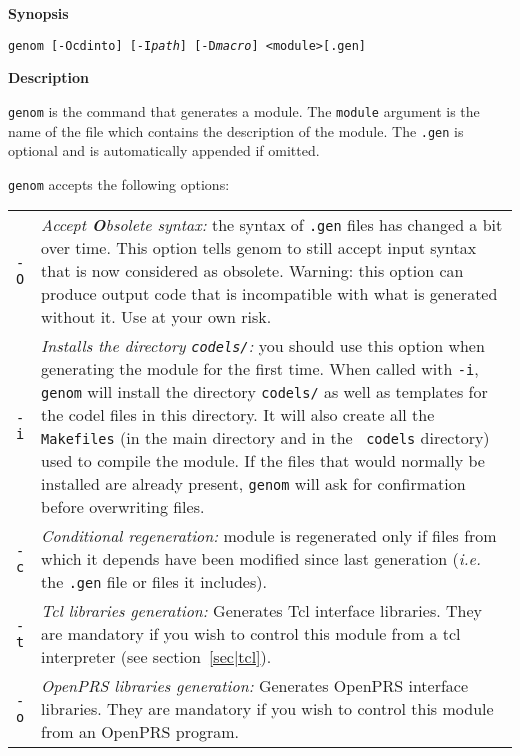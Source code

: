 \begin{description}

\item{\bf Synopsis}

{\tt genom [-Ocdinto] [-I{\em path}] [-D{\em macro}] <module>[.gen]}

\item{\bf Description}

{\tt genom}  is the  command that  generates a  module. The  {\tt module}
argument is the name  of the file which  contains the description of  the
module. The {\tt  .gen} is   optional and  is  automatically appended  if
omitted.

{\tt genom} accepts the following options:

\begin{tabularx}{\linewidth}{lX}
{\tt -O} & {\em Accept \textbf{O}bsolete syntax:} the syntax of
\texttt{.gen} files has changed a bit over time. This option tells
genom to still accept input syntax that is now considered as obsolete.
Warning: this option can produce output code that is incompatible with
what is generated without it. Use at your own risk. \\

{\tt -i} &  {\em Installs the  directory  {\tt codels/}:} you should  use
this option when  generating the module  for the first time. When  called
with {\tt -i}, {\tt  genom} will install  the directory {\tt  codels/} as
well as templates for  the codel files in this  directory.  It  will also
create  all the {\tt Makefiles}  (in the main directory   and in the {\tt
codels} directory) used to compile  the module.  If  the files that would
normally be  installed  are already present, {\tt   genom}  will ask  for
confirmation before overwriting files.\\

{\tt -c} & {\em Conditional regeneration:} module is regenerated only
if files from which  it depends have  been modified since last generation
({\em i.e.} the {\tt .gen} file or files it includes).\\

{\tt -t} &    {\em Tcl libraries  generation:}    Generates Tcl interface
libraries. They are mandatory  if you wish to  control this module from a
tcl interpreter (see section~\ref{sec|tcl}).\\

{\tt    -o}  & {\em    OpenPRS libraries generation:} Generates OpenPRS
interface libraries.  They are  mandatory  if you   wish to  control this
module from an OpenPRS program.\\


\end{tabularx}
\end{description}

